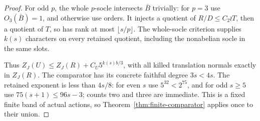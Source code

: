 \begin{proof}
For odd $p$, the whole $p$-socle intersects $\bar B$ trivially:
for $p=3$ use $O_3(\bar B)=1$, and otherwise use orders. It
injects a quotient of $R/D\leq C_2\wr T$, then a quotient
of $T$, so has rank at most $\lfloor s/p\rfloor$. The
whole-socle criterion supplies $k(s)$ characters on every retained
quotient, including the nonabelian socle in the same slots.

Thus $Z_J(U)\leq Z_J(R)+C_U5^{k(s)b/3}$, with all killed
translation normals exactly in $Z_J(R)$. The comparator has its
concrete faithful degree $3s<4s$. The retained exponent is less
than $4s/8$: for even $s$ use $5^{32}<2^{75}$, and for odd
$s\geq5$ use $75(s+1)\leq96s-3$; counts two and three are
immediate. This is a fixed finite band of actual actions, so
Theorem~\ref{thm:finite-comparator} applies once to their union.
\end{proof}
